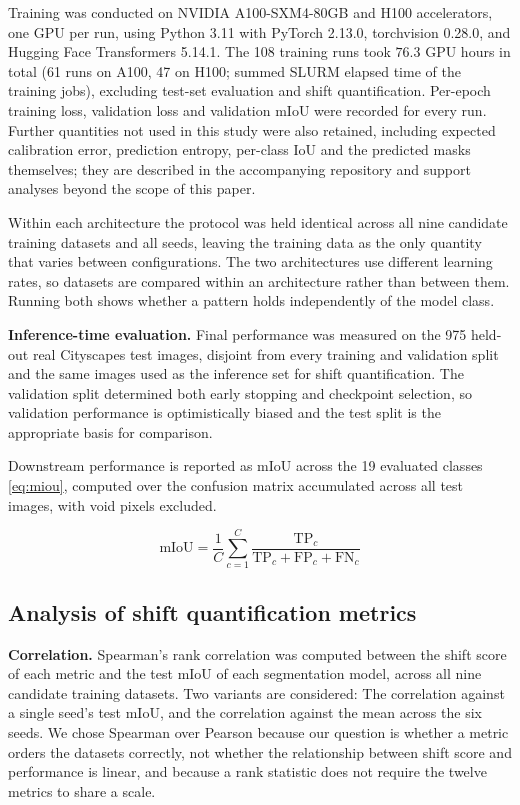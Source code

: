 \documentclass[conference]{IEEEtran}
\begin{document}
Training was conducted on NVIDIA A100-SXM4-80GB and H100 accelerators, one GPU per run, using Python 3.11 with PyTorch 2.13.0, torchvision 0.28.0, and Hugging Face Transformers 5.14.1. The 108 training runs took $76.3$ GPU hours in total (61 runs on A100, 47 on H100; summed SLURM elapsed time of the training jobs), excluding test-set evaluation and shift quantification. Per-epoch training loss, validation loss and validation mIoU were recorded for every run. Further quantities not used in this study were also retained, including expected calibration error, prediction entropy, per-class IoU and the predicted masks themselves; they are described in the accompanying repository and support analyses beyond the scope of this paper.

Within each architecture the protocol was held identical across all nine candidate training datasets and all seeds, leaving the training data as the only quantity that varies between configurations. The two architectures use different learning rates, so datasets are compared within an architecture rather than between them. Running both shows whether a pattern holds independently of the model class.

\textbf{Inference-time evaluation.} Final performance was measured on the 975 held-out real Cityscapes test images, disjoint from every training and validation split and the same images used as the inference set for shift quantification. The validation split determined both early stopping and checkpoint selection, so validation performance is optimistically biased and the test split is the appropriate basis for comparison.

Downstream performance is reported as mIoU across the 19 evaluated classes \eqref{eq:miou}, computed over the confusion matrix accumulated across all test images, with void pixels excluded.

\begin{equation}
\label{eq:miou}
\text{mIoU} = \frac{1}{C}\sum_{c=1}^{C} \frac{\text{TP}_c}{\text{TP}_c + \text{FP}_c + \text{FN}_c}
\end{equation}

\subsection{Analysis of shift quantification metrics}
\label{sec:analysis}
\textbf{Correlation.} Spearman's rank correlation was computed between the shift score of each metric and the test mIoU of each segmentation model, across all nine candidate training datasets. Two variants are considered: The correlation against a single seed's test mIoU, and the correlation against the mean across the six seeds. We chose Spearman over Pearson because our question is whether a metric orders the datasets correctly, not whether the relationship between shift score and performance is linear, and because a rank statistic does not require the twelve metrics to share a scale.
\end{document}
